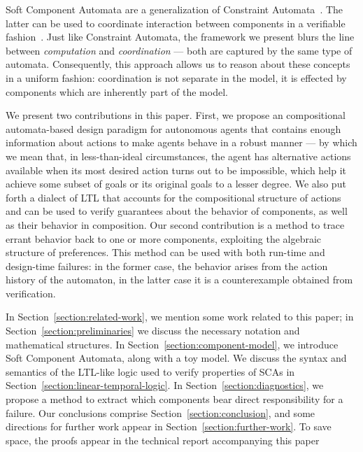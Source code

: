 \documentclass[a4paper]{article}
\theoremstyle{definition}
\begin{document}
Soft Component Automata are a generalization of Constraint Automata~\cite{baier-sirjani-arbab-rutten-2006}. The latter can be used to coordinate interaction between components in a verifiable fashion~\cite{baier-blechmann-klein-kluppelholz-leister-2010}. Just like Constraint Automata, the framework we present blurs the line between \emph{computation} and \emph{coordination} --- both are captured by the same type of automata. Consequently, this approach allows us to reason about these concepts in a uniform fashion: coordination is not separate in the model, it is effected by components which are inherently part of the model.

We present two contributions in this paper. First, we propose an compositional automata-based design paradigm for autonomous agents that contains enough information about actions to make agents behave in a robust manner --- by which we mean that, in less-than-ideal circumstances, the agent has alternative actions available when its most desired action turns out to be impossible, which help it achieve some subset of goals or its original goals to a lesser degree. We also put forth a dialect of LTL that accounts for the compositional structure of actions and can be used to verify guarantees about the behavior of components, as well as their behavior in composition. Our second contribution is a method to trace errant behavior back to one or more components, exploiting the algebraic structure of preferences. This method can be used with both run-time and design-time failures: in the former case, the behavior arises from the action history of the automaton, in the latter case it is a counterexample obtained from verification.

\medskip
In Section~\ref{section:related-work}, we mention some work related to this paper; in Section~\ref{section:preliminaries} we discuss the necessary notation and mathematical structures. In Section~\ref{section:component-model}, we introduce Soft Component Automata, along with a toy model. We discuss the syntax and semantics of the LTL-like logic used to verify properties of SCAs in Section~\ref{section:linear-temporal-logic}. In Section~\ref{section:diagnostics}, we propose a method to extract which components bear direct responsibility for a failure. Our conclusions comprise Section~\ref{section:conclusion}, and some directions for further work appear in Section~\ref{section:further-work}. 
\iftechreport\else%
To save space, the proofs appear in the technical report accompanying this paper~\cite{kappe-arbab-talcott-2017-techreport}
\fi
\end{document}
